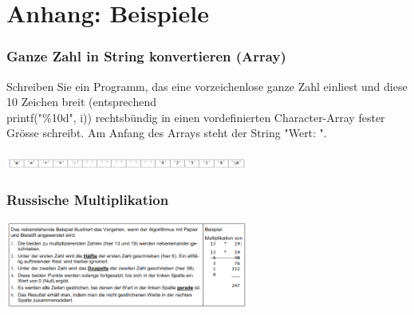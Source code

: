 \newpage
\section{Anhang: Beispiele}
	\subsubsection{Ganze Zahl in String konvertieren (Array)} 
		Schreiben Sie ein Programm, das eine vorzeichenlose ganze Zahl einliest und diese 10 Zeichen breit (entsprechend\\ printf("\%10d", i)) rechtsbündig in einen vordefinierten Character-Array fester Grösse schreibt. Am Anfang des Arrays steht der String "Wert: ".\\\\ 
		\includegraphics[width=0.6\textwidth]{pics/bsp1.png}
		
	\subsubsection	{Russische Multiplikation}
		\includegraphics[width=0.6\textwidth]{pics/bsp2.png}
		
		
		